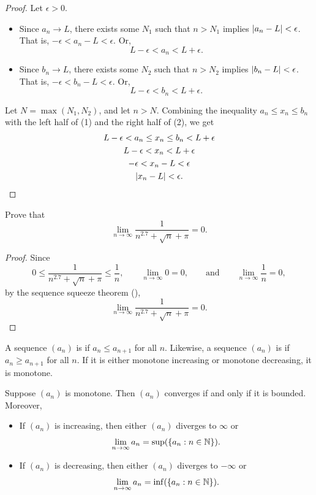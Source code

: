 \documentclass[11pt,twoside=off,numbers=noenddot]{scrbook}
\begin{document}
\begin{proof}
  Let $\epsilon > 0$.
  \begin{itemize}
    \item Since $a_n \to L$, there exists some $N_1$ such that $n >
      N_1$ implies $| a_n - L | < \epsilon$. That is, $-\epsilon <
      a_n - L < \epsilon$. Or,
      \[ L - \epsilon < a_n < L + \epsilon. \tag{1} \]

    \item Since $b_n \to L$, there exists some $N_2$ such that $n >
      N_2$ implies $| b_n - L | < \epsilon$. That is, $-\epsilon <
      b_n - L < \epsilon$. Or,
      \[ L - \epsilon < b_n < L + \epsilon. \tag{2} \]
  \end{itemize}

  Let $N = \max(N_1, N_2)$, and let $n > N$. Combining the
  inequality $a_n \leq x_n \leq b_n$ with the left half of (1) and
  the right half of (2), we get
  \begin{gather*}
    L - \epsilon < a_n \leq x_n \leq b_n < L + \epsilon \\
    L - \epsilon < x_n < L + \epsilon \\
    -\epsilon < x_n - L < \epsilon \\
    | x_n - L | < \epsilon.
  \end{gather*}
\end{proof}

\begin{example}
  Prove that
  \[ \lim_{n \to \infty} \frac{1}{n^{2.7} + \sqrt{n} + \pi} = 0. \]

  \begin{proof}
    Since
    \[ 0 \leq \frac{1}{n^{2.7} + \sqrt{n} + \pi} \leq \frac{1}{n},
      \qquad \lim_{n \to \infty} 0 = 0, \qquad \text{and} \qquad \lim_{n
    \to \infty} \frac{1}{n} = 0, \]
    by the sequence squeeze theorem (),
    \[ \lim_{n \to \infty} \frac{1}{n^{2.7} + \sqrt{n} + \pi} = 0. \]
  \end{proof}
\end{example}

\begin{definition}
  A sequence $(a_n)$ is  if $a_n \leq a_{n
  + 1}$ for all $n$. Likewise, a sequence $(a_n)$ is  if $a_n \geq a_{n + 1}$ for all $n$. If it is either
  monotone increasing or monotone decreasing, it is monotone.
\end{definition}

\begin{theorem}
  Suppose $(a_n)$ is monotone. Then $(a_n)$ converges if and only if
  it is bounded. Moreover,
  \begin{itemize}
    \item If $(a_n)$ is increasing, then either $(a_n)$ diverges to
      $\infty$ or
      \[ \lim_{n \to \infty} a_n = \sup(\{ a_n : n \in \mathbb N \}). \]
    \item If $(a_n)$ is decreasing, then either $(a_n)$ diverges to
      $-\infty$ or
      \[ \lim_{n \to \infty} a_n = \inf(\{ a_n : n \in \mathbb N \}). \]
  \end{itemize}
\end{theorem}
\end{document}
